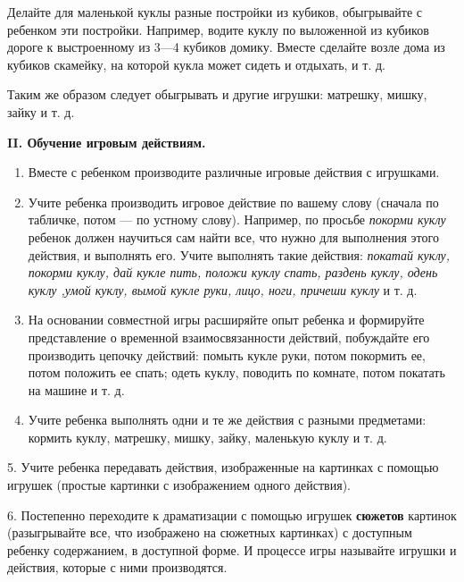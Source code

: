 \documentclass[a5paper]{book}
\renewcommand{\emph}[1]{\textit{#1}}
\begin{document}
Делайте для маленькой куклы разные постройки из кубиков, обыгрывайте с
ребенком эти постройки. Например, водите куклу по выложенной из кубиков
дороге к выстроенному из 3---4 кубиков домику. Вместе сделайте возле
дома из кубиков скамейку, на которой кукла может сидеть и отдыхать, и т.
д.

Таким же образом следует обыгрывать и другие игрушки: матрешку, мишку,
зайку и т. д.

\textbf{II. Обучение игровым действиям.}


\begin{enumerate}
\def\labelenumi{\arabic{enumi}.}
\item
  
  Вместе с ребенком производите различные игровые действия с игрушками.
  
\item
  
  Учите ребенка производить игровое действие по вашему слову (сначала по
  табличке, потом --- по устному слову). Например, по просьбе
  \emph{покорми куклу} ребенок должен научиться сам найти все, что нужно
  для выполнения этого действия, и выполнять его. Учите выполнять такие
  действия: \emph{покатай куклу, покорми куклу, дай кукле пить, положи
  куклу спать, раздень куклу, одень куклу ,умой куклу, вымой кукле руки,
  лицо, ноги, причеши куклу} и т. д.
  
\item
  
  На основании совместной игры расширяйте опыт ребенка и формируйте
  представление о временной взаимосвязанности действий, побуждайте его
  производить цепочку действий: помыть кукле руки, потом покормить ее,
  потом положить ее спать; одеть куклу, поводить по комнате, потом
  покатать на машине и т. д.
  
\item
  
  Учите ребенка выполнять одни и те же действия с разными предметами:
  кормить куклу, матрешку, мишку, зайку, маленькую куклу и т. д.
  
\end{enumerate}


5. Учите ребенка передавать действия, изображенные на картинках с
помощью игрушек (простые картинки с изображением одного действия).

6. Постепенно переходите к драматизации с помощью игрушек
\textbf{сюжетов} картинок (разыгрывайте все, что изображено на сюжетных
картинках) с доступным ребенку содержанием, в доступной форме. И
процессе игры называйте игрушки и действия, которые с ними производятся.
\end{document}
